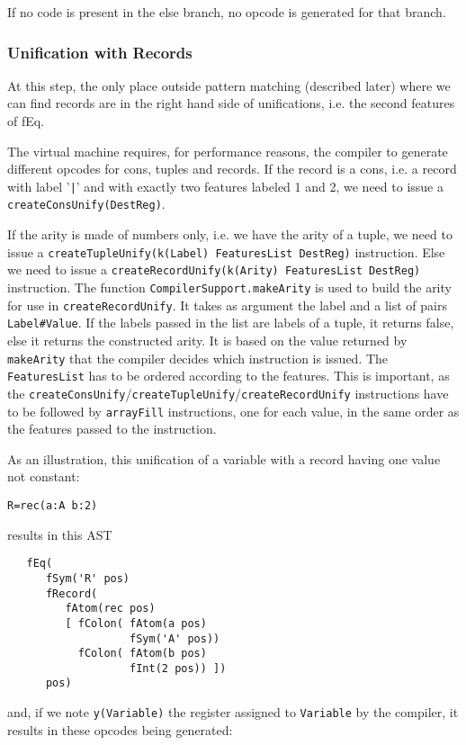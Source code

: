 \documentclass[a4paper]{memoir}
\begin{document}
If no code is present in the else branch, no opcode is generated for that branch.

\subsubsection{Unification with Records}
At this step, the only place outside pattern matching (described later) where we can find records are in the right hand side of unifications, i.e. the second features of fEq. 

The virtual machine requires, for performance reasons, the compiler to generate different opcodes for cons, tuples and records.
If the record is a cons, i.e. a record with label '\lstinline!|!' and with
exactly two features labeled 1 and 2, we need to issue a \lstinline!createConsUnify(DestReg)!. 

If the arity is made of numbers only, i.e. we have the arity of a tuple, we need
to issue a \lstinline!createTupleUnify(k(Label) FeaturesList DestReg)!
instruction. Else we need to issue a \lstinline!createRecordUnify(k(Arity) FeaturesList DestReg)! instruction.
The function \lstinline!CompilerSupport.makeArity! is used to build the arity
for use in \lstinline!createRecordUnify!. It takes as argument the label and a list of pairs \lstinline!Label#Value!. If the labels passed in the list are labels of a tuple, it returns false, else it returns the constructed arity. It is based on the value returned by \lstinline!makeArity! that the compiler decides which instruction is issued.
The \lstinline!FeaturesList! has to be ordered according to the features. This
is important, as the
\lstinline!createConsUnify!/\lstinline!createTupleUnify!/\lstinline!createRecordUnify! instructions have to be followed by \lstinline!arrayFill! instructions, one for each value, in the same order as the features passed to the instruction.

As an illustration, this unification of a variable with a record having one value not constant:
\begin{lstlisting}
R=rec(a:A b:2)
\end{lstlisting}
results in this AST
\begin{lstlisting}
   fEq(
      fSym('R' pos)
      fRecord(
         fAtom(rec pos)
         [ fColon( fAtom(a pos)
                   fSym('A' pos))
           fColon( fAtom(b pos)
                   fInt(2 pos)) ])
      pos)
\end{lstlisting}
and, if we note \lstinline!y(Variable)! the register assigned to \lstinline!Variable! by the compiler, it results in these opcodes being generated:
\end{document}
